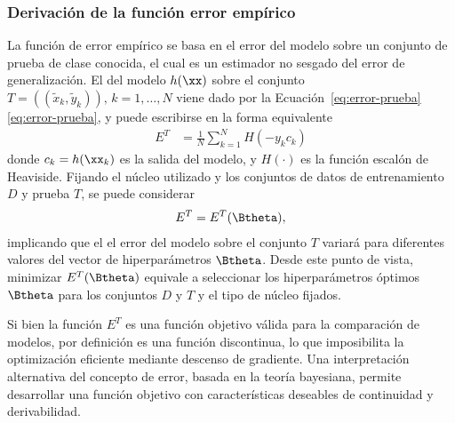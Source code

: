 %
\subsubsection{Derivación de la función error empírico}
%
La función de error empírico se basa en el error del modelo sobre un
conjunto de prueba de clase conocida, el cual es un estimador no
sesgado del error de generalización.  El  del
modelo $h(\xx)$ sobre el conjunto
$T=((\tilde{x}_k,\tilde{y}_k)),\,k=1,\ldots,N$ viene dado por
la \iflatexml{}Ecuación~\ref{eq:error-prueba}\else\autoref{eq:error-prueba}\fi,
y puede escribirse en la forma equivalente
%
\begin{align}
\label{e3:error-test-alt}
  E^T &= \frac{1}{N}\sum_{k=1}^{N} H(-{y}_k {c}_k)
\end{align}
%
donde $c_k=h(\xx_k)$ es la salida del modelo, y
$H(\cdot)$ es la función escalón de Heaviside. Fijando el núcleo
utilizado y los conjuntos de datos de entrenamiento $D$ y prueba $T$, se
puede considerar
%
\begin{align}
\label{e3:error-test-func-theta}  
  E^T = E^T(\Btheta),
\end{align}
%
implicando que el el error del modelo sobre el conjunto $T$ variará
para diferentes valores del vector de hiperparámetros $\Btheta$.
Desde este punto de vista, minimizar $E^T(\Btheta)$ equivale a
seleccionar los hiperparámetros óptimos $\Btheta$ para los conjuntos
$D$ y $T$ y el tipo de núcleo fijados.

Si bien la función $E^T$ es una función objetivo válida para la
comparación de modelos, por definición es una función discontinua, lo
que imposibilita la optimización eficiente mediante descenso de
gradiente. Una interpretación alternativa del concepto de error,
basada en la teoría bayesiana, permite desarrollar una función
objetivo con características deseables de continuidad y derivabilidad.

